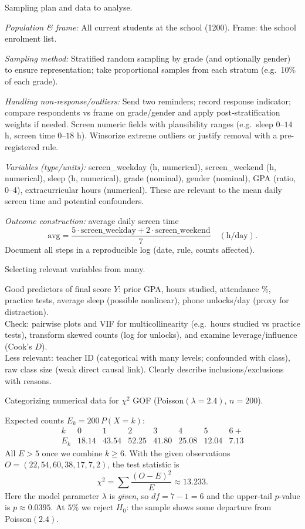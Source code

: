 \documentclass[11pt]{article}
\def\textbf#1{#1}%
\def\mathrm#1{#1}%
\begin{document}
\begin{solution}
\textbf{Sampling plan and data to analyse.}

\emph{Population \& frame:} All current students at the school (1200). Frame: the school enrolment list.

\emph{Sampling method:} \textbf{Stratified random sampling} by grade (and optionally gender) to ensure representation; take proportional samples from each stratum (e.g.\ 10\% of each grade).

\emph{Handling non‐response/outliers:} Send two reminders; record response indicator; compare respondents vs frame on grade/gender and apply post‐stratification weights if needed. Screen numeric fields with plausibility ranges (e.g.\ sleep $0$–$14$ h, screen time $0$–$18$ h). Winsorize extreme outliers or justify removal with a pre-registered rule.

\emph{Variables (type/units):} screen\_weekday (h, numerical), screen\_weekend (h, numerical), sleep (h, numerical), grade (nominal), gender (nominal), GPA (ratio, 0–4), extracurricular hours (numerical). These are relevant to the mean daily screen time and potential confounders.

\emph{Outcome construction:} average daily screen time
\[
\text{avg}=\frac{5\cdot \text{screen\_weekday}+2\cdot \text{screen\_weekend}}{7}\quad(\text{h/day}).
\]
Document all steps in a reproducible log (date, rule, counts affected).
\end{solution}

\begin{solution}
\textbf{Selecting relevant variables from many.}

Good predictors of final score $Y$: prior GPA, hours studied, attendance \%, practice tests, average sleep (possible nonlinear), phone unlocks/day (proxy for distraction). \\
Check: pairwise plots and VIF for multicollinearity (e.g.\ hours studied vs practice tests), transform skewed counts (log for unlocks), and examine leverage/influence (Cook’s $D$). \\
Less relevant: teacher ID (categorical with many levels; confounded with class), raw class size (weak direct causal link). Clearly describe inclusions/exclusions with reasons.
\end{solution}

\begin{solution}
\textbf{Categorizing numerical data for $\chi^2$ GOF (Poisson$(\lambda=2.4)$, $n=200$).}

Expected counts $E_k=200\,P(X=k)$:
\[
\begin{array}{c|ccccccc}
k & 0 & 1 & 2 & 3 & 4 & 5 & 6+\\\hline
E_k & 18.14 & 43.54 & 52.25 & 41.80 & 25.08 & 12.04 & 7.13
\end{array}
\]
All $E>5$ once we combine $k\ge 6$. With the given observations
$O=(22,54,60,38,17,7,2)$, the test statistic is
\[
\chi^2=\sum \frac{(O-E)^2}{E}\approx \boxed{13.233}.
\]
Here the model parameter $\lambda$ is \emph{given}, so
$\mathrm{df}=7-1= \boxed{6}$ and the upper‐tail $p$-value is
$\boxed{p\approx 0.0395}$. At $5\%$ we reject $H_0$: the sample shows some departure from Poisson$(2.4)$.
\end{solution}
\end{document}
